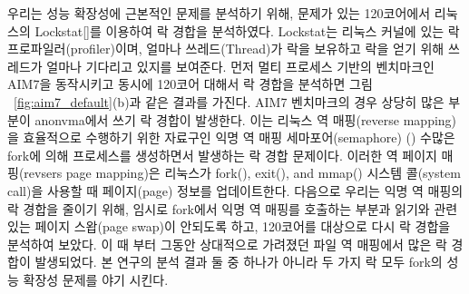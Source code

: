 
우리는 성능 확장성에 근본적인 문제를 분석하기 위해, 문제가 있는 120코어에서 리눅스의
 Lockstat[]를 이용하여 락 경합을 분석하였다.
 Lockstat는 리눅스 커널에 있는 락 프로파일러(profiler)이며, 얼마나  쓰레드(Thread)가 락을 보유하고 
 락을 얻기 위해 쓰레드가 얼마나 기다리고 있지를 보여준다.
먼저 멀티 프로세스 기반의 벤치마크인 AIM7을 동작시키고 동시에 120코어 대해서 락 경합을 분석하면 
그림 ~\ref{fig:aim7_default}(b)과 같은 결과를 가진다. 
AIM7 벤치마크의 경우 상당히 많은 부분이 anonvma에서 쓰기 락 경합이 발생한다. 
이는 리눅스 역 매핑(reverse mapping)을 효율적으로 수행하기 위한 자료구인 익명 역 매핑 세마포어(semaphore)
() 수많은 fork에 의해 프로세스를 생성하면서 발생하는 락 경합 문제이다.
이러한 역 페이지 매핑(revsers page mapping)은 리눅스가 fork(), exit(), and mmap() 시스템
콜(system call)을 사용할 때 페이지(page) 정보를 업데이트한다.
다음으로 우리는 익명 역 매핑의 락 경합을 줄이기 위해, 임시로 fork에서 익명 역 매핑를 호출하는 부분과 
읽기와 관련있는 페이지 스왑(page swap)이 안되도록 하고, 120코어를 대상으로 다시 락 경합을 분석하여 보았다.
이 때 부터 그동안 상대적으로 가려졌던 파일 역 매핑에서 많은 락 경합이 발생되었다.
본 연구의 분석 결과 둘 중 하나가 아니라 두 가지 락 모두 fork의 성능 확장성 문제를 야기 시킨다.

